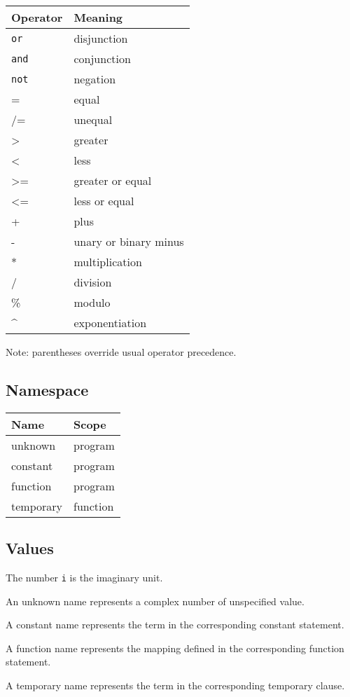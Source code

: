 \documentclass[letterpaper, 12pt]{extarticle}
\theoremstyle{definition} %
\newcommand{\code}[1]{\texttt{#1}}
\begin{document}
\begin{tabular}{l|l}
Operator & Meaning \\ \toprule
\code{or} & disjunction \\
\code{and} & conjunction \\
\code{not} & negation \\
= & equal \\
/= & unequal \\
\textgreater & greater \\
\textless & less \\
\textgreater= & greater or equal \\
\textless= & less or equal \\
+ & plus \\
- & unary or binary minus \\
* & multiplication \\
/ & division \\
\% & modulo \\
\^{} & exponentiation
\end{tabular}

Note: parentheses override usual operator precedence.

\subsection{Namespace}

\begin{tabular}{l|l}
Name & Scope \\ \toprule
unknown & program \\
constant & program \\
function & program \\
temporary & function
\end{tabular}

\subsection{Values}

The number \code{i} is the imaginary unit.

An unknown name represents a complex number
of unspecified value.

A constant name represents the term
in the corresponding constant statement.

A function name represents the mapping
defined in the corresponding function statement.

A temporary name represents the term
in the corresponding temporary clause.
\end{document}
